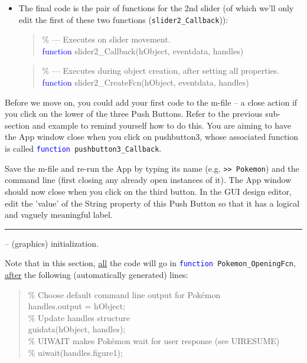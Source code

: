 \documentclass{tufte-book} %
\newenvironment{docspec}{\begin{quotation}\ttfamily\parskip0pt\parindent0pt\ignorespaces}{\end{quotation}}
\begin{document}
\begin{itemize}[noitemsep]
\item The final code is the pair of functions for the 2nd slider (of which we'll only edit the first of these two functions (\texttt{slider2\_Callback})):
\begin{docspec}
\textcolor[rgb]{0,0.501961,0}{\% --- Executes on slider movement.}
\\\textcolor{blue}{function} slider2\_Callback(hObject, eventdata, handles)
\end{docspec} 
\begin{docspec}
\textcolor[rgb]{0,0.501961,0}{\% --- Executes during object creation, after setting all properties.}
\\\textcolor{blue}{function} slider2\_CreateFcn(hObject, eventdata, handles)
\end{docspec} 
\end{itemize}

Before we move on, you could add your first code to the \textsf{m-file} -- a close action if you click on the lower of the three \textsf{Push Buttons}. Refer to the previous sub-section and example to remind yourself how to do this. You are aiming to have the App window close when you click on \textsf{pushbutton3}, whose associated function is called \texttt{\textcolor{blue}{function} pushbutton3\_Callback}.

Save the \textsf{m-file} and re-run the App by typing its name (e.g. \texttt{>> Pokemon}) and the command line (first closing any already open instances of it). The App window should now close when you click on the third button. In the GUI design editor, edit the 'value' of the \textsf{String} property of this \textsf{Push Button} so that it has a logical and vaguely meaningful label. 

\vspace{1mm}
\noindent\rule{4cm}{0.5pt}
\vspace{-2mm}

 -- (graphics) initialization. 

\noindent Note that in this section, \uline{all} the code will go in \texttt{\textcolor{blue}{function} Pokemon\_OpeningFcn}, \uline{after} the following (automatically generated) lines:
\begin{docspec}
\textcolor[rgb]{0,0.501961,0}{\% Choose default command line output for Pok\'emon}
\\handles.output = hObject;
\textcolor[rgb]{0,0.501961,0}{\\\% Update handles structure}
\\guidata(hObject, handles);
\textcolor[rgb]{0,0.501961,0}{\\\% UIWAIT makes Pok\'emon wait for user response (see UIRESUME)
\\\% uiwait(handles.figure1);}
\end{docspec}
\end{document}
